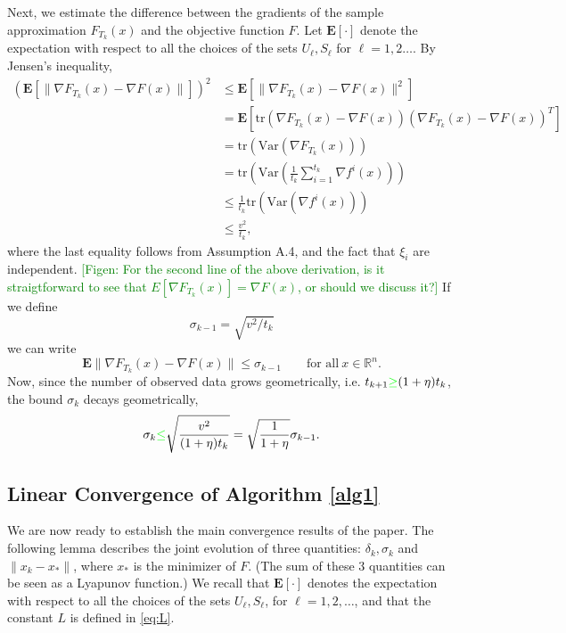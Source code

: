 \documentclass[11pt]{article}
\newcommand{\Var}{\mathrm{Var}}
\newcommand{\E}{\mathbf{E}}
\begin{document}
Next, we estimate the difference between the gradients of the sample approximation $F_{T_k}(x)$  and the objective function $F$.  Let $\E [\cdot]$ denote the expectation with respect to all the choices of the sets $U_\ell, S_\ell$ for $\ell=1, 2 \ldots$.
By Jensen's inequality,
\begin{align*}
 (\E [\|\nabla F_{T_k}(x) - \nabla F(x)\| ])^2 & \leq \E [ \|\nabla F_{T_k}(x) - \nabla F(x)\|^2 ]\\
  & = \E[\mbox{tr}(\nabla F_{T_k}(x) - \nabla F(x))(\nabla F_{T_k}(x) - \nabla F(x))^T]\\
  & = \mbox{tr}(\Var (\nabla F_{T_k}(x) )) \\
  & = \mbox{tr}\left(\Var \left(\frac{1}{t_{k}}\sum_{i=1}^{t_k} \nabla f^i(x)\right) \right) \\
  & \leq \frac{1}{t_k}\mbox{tr}(\Var(\nabla f^i(x))) \\
  &  \leq \frac{v^2}{t_k} ,
\end{align*}
where the last equality follows from Assumption A.4, and the fact that $\xi_i$ are independent.
\textcolor{green}{[Figen: For the second line of the above derivation, is it straigtforward to see that $E[\nabla F_{T_k}(x)]=\nabla F(x)$, or should we discuss it?]}
If we define
\begin{equation}   \label{sigmad}
 \sigma_{k-1} = \sqrt{{v^2}/{t_k}}
 \end{equation}
 we can write
\begin{equation}\label{vat}
 \E \|\nabla F_{T_k}(x) - \nabla F(x)\| \leq \sigma_{k-1} \qquad\mbox{for all} \ x \in \mathbb{R}^n.
\end{equation}
Now, since the number of observed data grows geometrically,  i.e. $t_{k+1} \textcolor{green}{\geq} (1+\eta)t_k$, the bound $\sigma_k$ decays geometrically,
\begin{equation} \label{sigma}
 \sigma_k \textcolor{green}{\leq} \sqrt{\frac{v^2}{(1+\eta)t_k}} = \sqrt{ \frac{1}{1+\eta}} \sigma_{k-1}.
\end{equation}

\subsection{Linear Convergence of Algorithm \ref{alg1}}

We are now ready to establish the main convergence results of the paper.
The following lemma describes the joint evolution of three quantities:  $\delta_k, \sigma_k$ and  $ \| x_k - x_*\|$, where $x_*$ is the minimizer of $F$. (The sum of these 3 quantities can be seen as a Lyapunov function.) We recall that  $\E [\cdot]$ denotes the expectation with respect to all the choices of  the sets $U_\ell, S_\ell$, for $\ell = 1, 2, \ldots $, and that the constant $L$ is defined in \eqref{eq:L}. 
\end{document}
